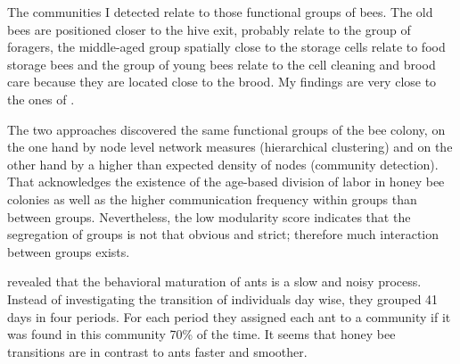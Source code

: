 The communities I detected relate to those functional groups of bees. The old bees are positioned closer to the hive exit, probably relate to the group of foragers, the middle-aged group spatially close to the storage cells relate to food storage bees and the group of young bees relate to the cell cleaning and brood care because they are located close to the brood. My findings are very close to the ones of \textcite{baracchi2014socio}.

The two approaches discovered the same functional groups of the bee colony, on the one hand by node level network measures (hierarchical clustering) and on the other hand by a higher than expected density of nodes (community detection).
That acknowledges the existence of the age-based division of labor in honey bee colonies as well as the higher communication frequency within groups than between groups. Nevertheless, the low modularity score indicates that the segregation of groups is not that obvious and strict; therefore much interaction between groups exists.

\textcite{mersch2013tracking} revealed that the behavioral maturation of ants is a slow and noisy process. Instead of investigating the transition of individuals day wise, they grouped 41 days in four periods. For each period they assigned each ant to a community if it was found in this community 70\% of the time.
It seems that honey bee transitions are in contrast to ants faster and smoother.
